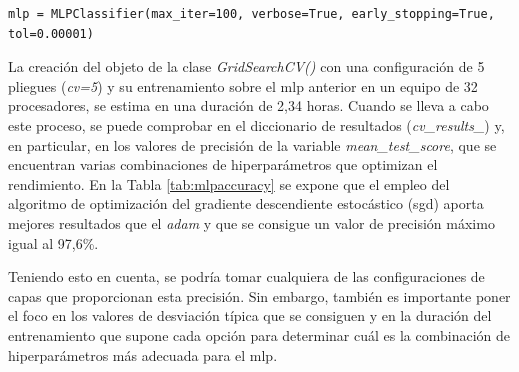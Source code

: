 \vspace{3mm}

\begin{lstlisting}[style=Python, caption={Clasificador MLP por defecto}]
  mlp = MLPClassifier(max_iter=100, verbose=True, early_stopping=True, tol=0.00001)
\end{lstlisting}

\vspace{3mm}

La creación del objeto de la clase \textit{GridSearchCV()} con una configuración de 5 pliegues (\textit{cv=5}) y su entrenamiento sobre el \gls{mlp} anterior en un equipo de 32 procesadores, se estima en una duración de 2,34 horas. Cuando se lleva a cabo este proceso, se puede comprobar en el diccionario de resultados (\textit{cv\_results\_}) y, en particular, en los valores de precisión de la variable \textit{mean\_test\_score}, que se encuentran varias combinaciones de hiperparámetros que optimizan el rendimiento. En la Tabla \ref{tab:mlpaccuracy} se expone que el empleo del algoritmo de optimización del gradiente descendiente estocástico (\gls{sgd}) aporta mejores resultados que el \textit{adam} y que se consigue un valor de precisión máximo igual al 97,6\%. 

\vspace{3mm}

Teniendo esto en cuenta, se podría tomar cualquiera de las configuraciones de capas que proporcionan esta precisión. Sin embargo, también es importante poner el foco en los valores de desviación típica que se consiguen y en la duración del entrenamiento que supone cada opción para determinar cuál es la combinación de hiperparámetros más adecuada para el \gls{mlp}. 

\vspace{3mm}

